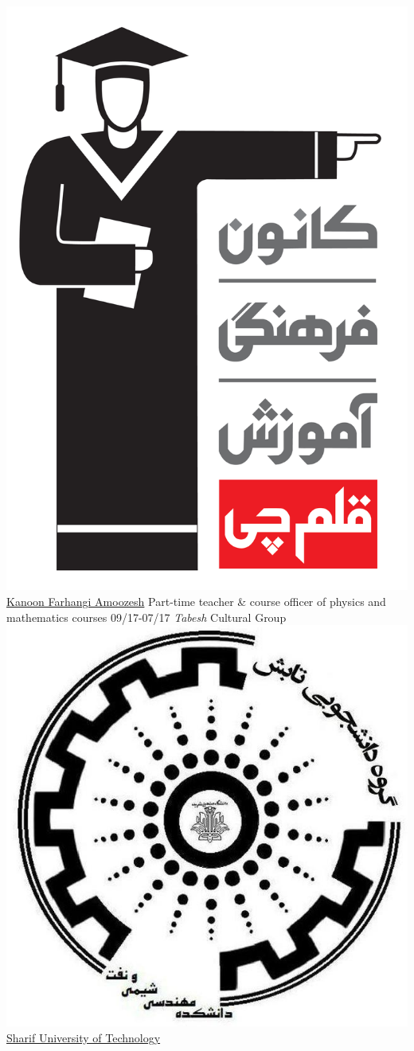 \documentclass[a4paper]{friggeri-cv}
\begin{document}
\begin{entrylist}
    {\href{http://www.kanoon.ir}{\includegraphics[scale=0.005]{img/Kanoon_logo.png} Kanoon Farhangi Amoozesh}}
    {Part-time teacher \& course officer of physics and mathematics courses}
  \entry
    {09/17-07/17}
    {   \emph{Tabesh} Cultural Group}
    {\href{http://www.sharif.ir}{\includegraphics[scale=0.03]{img/Tabesh_logo.jpg} Sharif University of Technology}}

\end{entrylist}
\end{document}
